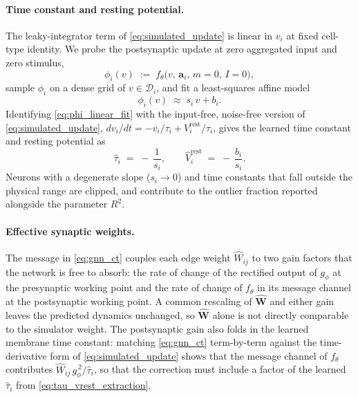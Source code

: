 \documentclass{article}
\begin{document}
{\paragraph{Time constant and resting potential.}
The leaky-integrator term of \cref{eq:simulated_update} is
linear in $v_i$ at fixed cell-type identity. We probe the
postsynaptic update at zero aggregated input and zero stimulus,
\begin{equation}
    \phi_i(v) \;:=\; f_\theta\!\big(v,\,\mathbf{a}_i,\,m=0,\,I=0\big),
\end{equation}
sample $\phi_i$ on a dense grid of $v\in\mathcal{D}_i$, and fit a
least-squares affine model
\begin{equation}
    \phi_i(v) \;\approx\; s_i\,v + b_i.
    \label{eq:phi_linear_fit}
\end{equation}
Identifying \cref{eq:phi_linear_fit} with the input-free,
noise-free version of \cref{eq:simulated_update},
$dv_i/dt = -v_i/\tau_i + V_i^{\mathrm{rest}}/\tau_i$, gives the
learned time constant and resting potential as
\begin{equation}
    \hat{\tau}_i \;=\; -\,\frac{1}{s_i},
    \qquad
    \hat{V}^{\mathrm{rest}}_i \;=\; -\,\frac{b_i}{s_i}.
    \label{eq:tau_vrest_extraction}
\end{equation}
Neurons with a degenerate slope ($s_i \to 0$) and time constants
that fall outside the physical range are clipped, and contribute
to the outlier fraction reported alongside the parameter $R^2$.

\paragraph{Effective synaptic weights.}
The message in \cref{eq:gnn_ct} couples each edge weight
$\hat{W}_{ij}$ to two gain factors that the network is
free to absorb: the rate of change of the rectified output of
$g_\phi$ at the presynaptic working point and the rate of change of
$f_\theta$ in its message channel at the postsynaptic working
point. A common rescaling of $\hat{\mathbf{W}}$ and either gain
leaves the predicted dynamics unchanged, so $\hat{\mathbf{W}}$
alone is not directly comparable to the simulator weight. The
postsynaptic gain also folds in the learned membrane time constant:
matching \cref{eq:gnn_ct} term-by-term against the time-derivative
form of \cref{eq:simulated_update} shows that the message channel
of $f_\theta$ contributes $\hat W_{ij}\,g_\phi^{\,2}/\hat\tau_i$,
so that the correction must include a factor of the learned
$\hat\tau_i$ from \cref{eq:tau_vrest_extraction}.

}
\end{document}
